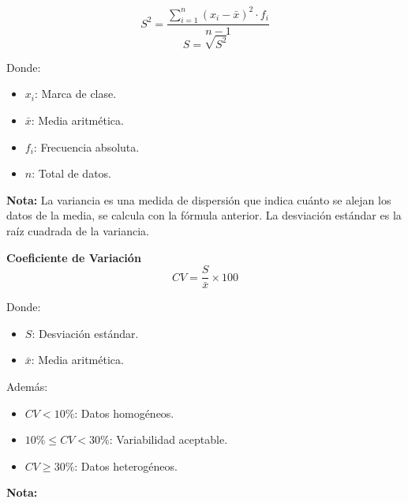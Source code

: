 \documentclass[11pt, a4paper]{article}
\newenvironment{varianciaYDesviacionEstandar}{}{}
\newenvironment{coeficienteDeVariacion}{}{}
\begin{document}
\begin{multicols}{2}
\begin{varianciaYDesviacionEstandar}
\begin{center}
            \hrulefill
            \begin{equation*}
                S^2 = \frac{\sum\limits_{i=1}^{n} (x_i - \bar{x})^2 \cdot f_i}{n-1}
            \end{equation*}
            \begin{equation*}
                S = \sqrt{S^2}
            \end{equation*}
        \end{center}
        \vspace{-1cm}
        Donde:
        \begin{itemize}
            \item $x_i$: Marca de clase.
            \item $\bar{x}$: Media aritmética.
            \item $f_i$: Frecuencia absoluta.
            \item $n$: Total de datos.
        \end{itemize}
        \textbf{Nota:}
        La variancia es una medida de dispersión que indica cuánto se alejan los datos de la media, se calcula con la fórmula anterior. La desviación estándar es la raíz cuadrada de la variancia.
    \end{varianciaYDesviacionEstandar}
    \begin{coeficienteDeVariacion}
        \begin{center}
            \textbf{\large Coeficiente de Variación}
            \hrulefill
            \begin{equation*}
                CV = \frac{S}{\bar{x}} \times 100
            \end{equation*}
        \end{center}
        \vspace{-1cm}
        Donde:
        \begin{itemize}
            \item $S$: Desviación estándar.
            \item $\bar{x}$: Media aritmética.
        \end{itemize}
        Además:
        \begin{itemize}
            \item $CV < 10 \%$: Datos homogéneos.
            \item $10 \% \leq CV < 30 \%$: Variabilidad aceptable.
            \item $CV \geq 30 \%$: Datos heterogéneos.
        \end{itemize}
        \textbf{Nota:}

\end{coeficienteDeVariacion}
\end{multicols}
\end{document}
